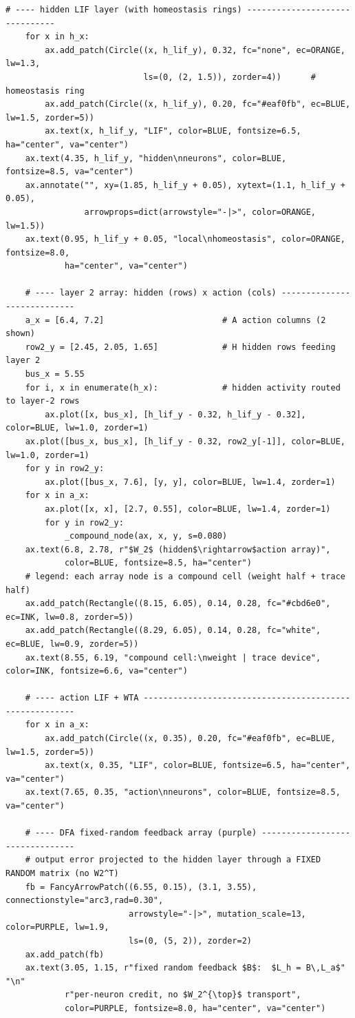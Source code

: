 \begin{lstlisting}[caption={schematics.ipynb code cell 8},label={lst:mrl-nb-schematics-8}]
    # ---- hidden LIF layer (with homeostasis rings) -------------------------------
    for x in h_x:
        ax.add_patch(Circle((x, h_lif_y), 0.32, fc="none", ec=ORANGE, lw=1.3,
                            ls=(0, (2, 1.5)), zorder=4))      # homeostasis ring
        ax.add_patch(Circle((x, h_lif_y), 0.20, fc="#eaf0fb", ec=BLUE, lw=1.5, zorder=5))
        ax.text(x, h_lif_y, "LIF", color=BLUE, fontsize=6.5, ha="center", va="center")
    ax.text(4.35, h_lif_y, "hidden\nneurons", color=BLUE, fontsize=8.5, va="center")
    ax.annotate("", xy=(1.85, h_lif_y + 0.05), xytext=(1.1, h_lif_y + 0.05),
                arrowprops=dict(arrowstyle="-|>", color=ORANGE, lw=1.5))
    ax.text(0.95, h_lif_y + 0.05, "local\nhomeostasis", color=ORANGE, fontsize=8.0,
            ha="center", va="center")

    # ---- layer 2 array: hidden (rows) x action (cols) ----------------------------
    a_x = [6.4, 7.2]                        # A action columns (2 shown)
    row2_y = [2.45, 2.05, 1.65]             # H hidden rows feeding layer 2
    bus_x = 5.55
    for i, x in enumerate(h_x):             # hidden activity routed to layer-2 rows
        ax.plot([x, bus_x], [h_lif_y - 0.32, h_lif_y - 0.32], color=BLUE, lw=1.0, zorder=1)
    ax.plot([bus_x, bus_x], [h_lif_y - 0.32, row2_y[-1]], color=BLUE, lw=1.0, zorder=1)
    for y in row2_y:
        ax.plot([bus_x, 7.6], [y, y], color=BLUE, lw=1.4, zorder=1)
    for x in a_x:
        ax.plot([x, x], [2.7, 0.55], color=BLUE, lw=1.4, zorder=1)
        for y in row2_y:
            _compound_node(ax, x, y, s=0.080)
    ax.text(6.8, 2.78, r"$W_2$ (hidden$\rightarrow$action array)",
            color=BLUE, fontsize=8.5, ha="center")
    # legend: each array node is a compound cell (weight half + trace half)
    ax.add_patch(Rectangle((8.15, 6.05), 0.14, 0.28, fc="#cbd6e0", ec=INK, lw=0.8, zorder=5))
    ax.add_patch(Rectangle((8.29, 6.05), 0.14, 0.28, fc="white", ec=BLUE, lw=0.9, zorder=5))
    ax.text(8.55, 6.19, "compound cell:\nweight | trace device", color=INK, fontsize=6.6, va="center")

    # ---- action LIF + WTA --------------------------------------------------------
    for x in a_x:
        ax.add_patch(Circle((x, 0.35), 0.20, fc="#eaf0fb", ec=BLUE, lw=1.5, zorder=5))
        ax.text(x, 0.35, "LIF", color=BLUE, fontsize=6.5, ha="center", va="center")
    ax.text(7.65, 0.35, "action\nneurons", color=BLUE, fontsize=8.5, va="center")

    # ---- DFA fixed-random feedback array (purple) --------------------------------
    # output error projected to the hidden layer through a FIXED RANDOM matrix (no W2^T)
    fb = FancyArrowPatch((6.55, 0.15), (3.1, 3.55), connectionstyle="arc3,rad=0.30",
                         arrowstyle="-|>", mutation_scale=13, color=PURPLE, lw=1.9,
                         ls=(0, (5, 2)), zorder=2)
    ax.add_patch(fb)
    ax.text(3.05, 1.15, r"fixed random feedback $B$:  $L_h = B\,L_a$" "\n"
            r"per-neuron credit, no $W_2^{\top}$ transport",
            color=PURPLE, fontsize=8.0, ha="center", va="center")


\end{lstlisting}
